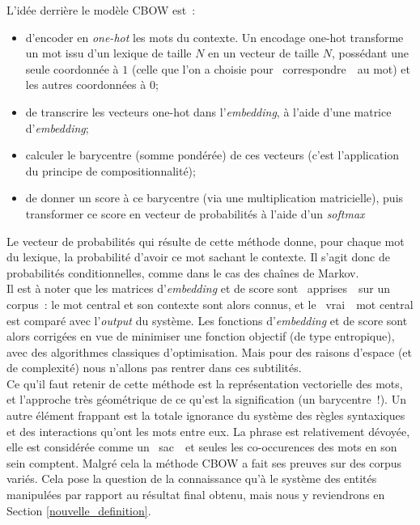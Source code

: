 \documentclass{article}
\begin{document}
				L'idée derrière le modèle CBOW est~:
				\vspace{2mm}
				\begin{itemize}
					\item d'encoder en \textit{one-hot} les mots du contexte. Un encodage one-hot transforme un mot issu d'un lexique de taille $N$ en un vecteur de taille $N$, possédant une seule coordonnée à $1$ (celle que l'on a choisie pour \guillemotleft~correspondre~\guillemotright~au mot) et les autres coordonnées à $0$;
					\item de transcrire les vecteurs one-hot dans l'\textit{embedding}, à l'aide d'une matrice d'\textit{embedding};
					\item calculer le barycentre (somme pondérée) de ces vecteurs (c'est l'application du principe de compositionnalité);
					\item de donner un score à ce barycentre (via une multiplication matricielle), puis transformer ce score en vecteur de probabilités à l'aide d'un \textit{softmax}
				\end{itemize}
				\vspace{2mm}
				Le vecteur de probabilités qui résulte de cette méthode donne, pour chaque mot du lexique, la probabilité d'avoir ce mot sachant le contexte. Il s'agit donc de probabilités conditionnelles, comme dans le cas des chaînes de Markov.\\
				
				Il est à noter que les matrices d'\textit{embedding} et de score sont \guillemotleft~apprises~\guillemotright~sur un corpus~: le mot central et son contexte sont alors connus, et le \guillemotleft~vrai~\guillemotright~mot central est comparé avec l'\textit{output} du système. Les fonctions d'\textit{embedding} et de score sont alors corrigées en vue de minimiser une fonction objectif (de type entropique), avec des algorithmes classiques d'optimisation. Mais pour des raisons d'espace (et de complexité) nous n'allons pas rentrer dans ces subtilités. \\
				
				Ce qu'il faut retenir de cette méthode est la représentation vectorielle des mots, et l'approche très géométrique de ce qu'est la signification (un barycentre~!). Un autre élément frappant est la totale ignorance du système des règles syntaxiques et des interactions qu'ont les mots entre eux. La phrase est relativement dévoyée, elle est considérée comme un \guillemotleft~sac~\guillemotright~et seules les co-occurences des mots en son sein comptent. Malgré cela la méthode CBOW a fait ses preuves sur des corpus variés. Cela pose la question de la connaissance qu'à le système des entités manipulées par rapport au résultat final obtenu, mais nous y reviendrons en Section \ref{nouvelle_definition}.
\end{document}
